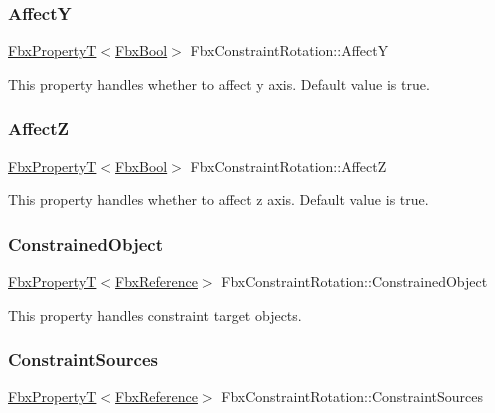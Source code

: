 \subsubsection{\texorpdfstring{AffectY}{AffectY}}
{\footnotesize\ttfamily \hyperlink{class_fbx_property_t}{Fbx\+PropertyT}$<$\hyperlink{fbxtypes_8h_a92e0562b2fe33e76a242f498b362262e}{Fbx\+Bool}$>$ Fbx\+Constraint\+Rotation\+::\+AffectY}

This property handles whether to affect y axis. Default value is true. \mbox{\label{class_fbx_constraint_rotation_af7a3d171bfeb0e5fa72d292756c64848}} 
\subsubsection{\texorpdfstring{AffectZ}{AffectZ}}
{\footnotesize\ttfamily \hyperlink{class_fbx_property_t}{Fbx\+PropertyT}$<$\hyperlink{fbxtypes_8h_a92e0562b2fe33e76a242f498b362262e}{Fbx\+Bool}$>$ Fbx\+Constraint\+Rotation\+::\+AffectZ}

This property handles whether to affect z axis. Default value is true. \mbox{\label{class_fbx_constraint_rotation_aee0715edab2a99b52a40f35aba1d662c}} 
\subsubsection{\texorpdfstring{Constrained\+Object}{ConstrainedObject}}
{\footnotesize\ttfamily \hyperlink{class_fbx_property_t}{Fbx\+PropertyT}$<$\hyperlink{fbxtypes_8h_a44df6a2eec915cf27cd481e5c5e48a24}{Fbx\+Reference}$>$ Fbx\+Constraint\+Rotation\+::\+Constrained\+Object}

This property handles constraint target objects. \mbox{\label{class_fbx_constraint_rotation_ac9bb2a7227a6034425e06395a03d57a6}} 
\subsubsection{\texorpdfstring{Constraint\+Sources}{ConstraintSources}}
{\footnotesize\ttfamily \hyperlink{class_fbx_property_t}{Fbx\+PropertyT}$<$\hyperlink{fbxtypes_8h_a44df6a2eec915cf27cd481e5c5e48a24}{Fbx\+Reference}$>$ Fbx\+Constraint\+Rotation\+::\+Constraint\+Sources}

